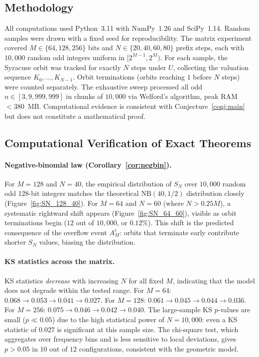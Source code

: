 \documentclass[12pt]{article}
\theoremstyle{definition}
\theoremstyle{remark}
\begin{document}
\subsection{Methodology}

All computations used Python~3.11 with NumPy~1.26 and SciPy~1.14.
Random samples were drawn with a fixed seed for reproducibility.
The matrix experiment covered $M\in\{64,128,256\}$ bits and
$N\in\{20,40,60,80\}$ prefix steps, each with $10{,}000$ random
odd integers uniform in $[2^{M-1},2^M)$.
For each sample, the Syracuse orbit was tracked for exactly $N$ steps
under $U$, collecting the valuation sequence $K_0,\ldots,K_{N-1}$.
Orbit terminations (orbits reaching $1$ before $N$ steps) were
counted separately.
The exhaustive sweep processed all odd $n\in[3,9{,}999{,}999]$
in chunks of $10{,}000$ via Welford's algorithm, peak RAM~$<380$~MB.
Computational evidence is consistent with Conjecture~\ref{conj:main}
but does not constitute a mathematical proof.

\subsection{Computational Verification of Exact Theorems}

\paragraph{Negative-binomial law (Corollary~\ref{cor:negbin}).}
For $M=128$ and $N=40$, the empirical distribution of $S_N$
over $10{,}000$ random odd 128-bit integers matches the theoretical
$\mathrm{NB}(40,1/2)$ distribution closely (Figure~\ref{fig:SN_128_40}).
For $M=64$ and $N=60$ (where $N>0.25M$), a systematic rightward shift
appears (Figure~\ref{fig:SN_64_60}), visible as orbit terminations
begin ($12$ out of $10{,}000$, or $0.12\%$).
This shift is the predicted consequence of the overflow event $A_M^c$:
orbits that terminate early contribute shorter $S_N$ values, biasing
the distribution.

\paragraph{KS statistics across the matrix.}
KS statistics \emph{decrease} with increasing $N$ for all fixed $M$,
indicating that the model does not degrade within the tested range.
For $M=64$: $0.068\to 0.053\to 0.041\to 0.027$.
For $M=128$: $0.061\to 0.045\to 0.044\to 0.036$.
For $M=256$: $0.075\to 0.046\to 0.042\to 0.040$.
The large-sample KS $p$-values are small ($p\ll 0.05$) due to
the high statistical power of $N=10{,}000$: even a KS statistic of
$0.027$ is significant at this sample size.
The chi-square test, which aggregates over frequency bins and is
less sensitive to local deviations, gives $p>0.05$ in $10$ out of
$12$ configurations, consistent with the geometric model.
\end{document}
